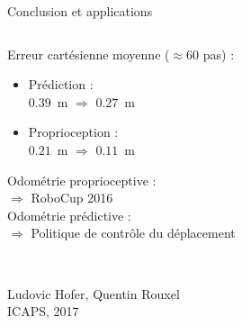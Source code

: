 \begin{frame}{Conclusion et applications}
    \begin{columns}
        \begin{column}{0.4\linewidth}
            Erreur cartésienne moyenne ($\approx60$ pas) :
            \begin{itemize}
                \item Prédiction :\\
                    $0.39$~m $\Rightarrow$ $\bm{0.27}$~m 
                \item Proprioception :\\
                    $0.21$~m $\Rightarrow$ $\bm{0.11}$~m 
            \end{itemize}
            \vspace{1.0em}
            Odométrie proprioceptive :\\
            $\Longrightarrow$ RoboCup 2016\\
            \vspace{1.0em}
            Odométrie prédictive :\\
            $\Longrightarrow$ Politique de contrôle du déplacement
        \end{column}
        \begin{column}{0.6\linewidth}
            \centering
        \end{column}
    \end{columns}
    \begin{block}{}
        \\
        \scriptsize
        Ludovic Hofer, Quentin Rouxel\\
        ICAPS, 2017
    \end{block}
\end{frame}
